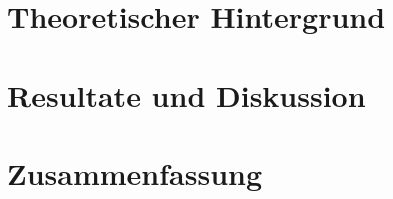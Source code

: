 \documentclass[11pt]{scrreport}
\numberwithin{equation}{chapter}
\begin{document}
	\chapter{Theoretischer Hintergrund} %
	
	\chapter{Resultate und Diskussion} %
	
	\chapter{Zusammenfassung} %
	
	\listoffigures
	\printbibliography
	
\end{document}
